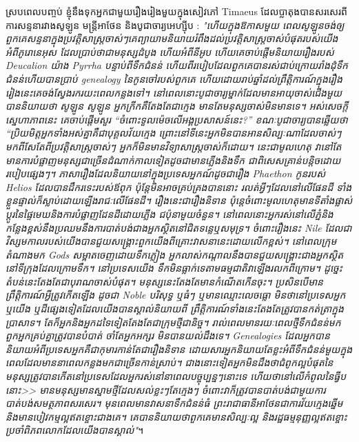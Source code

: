 \documentclass[10pt,twocolumn,letterpaper]{article}
\begin{document}
ស្របពេលបញ្ចប់ ខ្ញុំនឹងទុកអ្នកជាមួយរឿងរៀងមួយ​ក្នុងសៀវភៅ Timaeus ដែលប្លាតុងបានសរសេរពីការសន្ទនារវាង​សូឡូន មន្រ្តីអាថែន និងបូជាចារ្យអេហ្ស៊ីប \cite{140}: \textit{"ហើយក្នុងឱកាសមួយ ពេលសូឡូនចង់ឲ្យពួកគេសន្ទនាក្នុងប្រវត្តិសាស្ត្រចាស់ៗគេព្យាយាមនិយាយរំពឹងដល់ប្រវត្តិសាស្ត្រចាស់បំផុតរបស់យើង អំពីភូរោនេអុស ដែលប្រាប់ថាជាមនុស្សដំបូង ហើយអំពីនីអូប ហើយគេចាប់ផ្តើមនិយាយរឿងរបស់ Deucalion យ៉ាង Pyrrha បន្ទាប់ពីទឹកជំនន់ ហើយពីរបៀបដែលពួកគេបានរស់ជាប់ក្រោយរាំងដុំទឹកជំនន់ហើយបានប្រាប់ genealogy នៃកូនចៅរបស់ពួកគេ ហើយដោយរាប់ឆ្នាំដល់ព្រឹត្តិការណ៍ក្នុងរឿងរៀងនេះគេចង់ស្វែងរករយះពេលកន្លងទៅ។ នៅពេលនោះបូជាចារ្យម្នាក់ដែលមានអាយុចាស់ជើងមួយបាននិយាយថា សូឡូន សូឡូន អ្នកក្រីកគឺតែងតែជាក្មេង មានតែមនុស្សចាស់មិនមានទេ។ អស់សេចក្តីស្នេហាភាពនេះ គេចាប់ផ្តើមសួរ “ចំពោះទួលម៉េចលើអង្គប្រសាសន៍នេះ?” ខណៈបូជាចារ្យបានឆ្លើយថា “ប្រិយមិត្តអ្នកទាំងអស់គ្នាគឺជាបុគ្គលវ័យក្មេង ព្រោះនៅទីនេះអ្នកមិនបានអានសិល្បៈណាដែលចាស់ៗមកពីសែតែពីប្រវត្តិសាស្ត្រចាស់ៗ អ្នកក៏មិនមានវិទ្យាសាស្ត្រចាស់ក៏ដោយ។ នេះជាមូលហេតុ វានៅតែមានការបំផ្លាញមនុស្សជាច្រើនដំណាក់កាលទៀតដូចជាមានភ្លើងនិងទឹក ជាពិសេសគ្រាន់បន្តិចដោយរបៀបផ្សេងៗ។ ភាសារឿងដែលនិយាយនៅក្នុងប្រទេសអ្នកណ៍ដូចជារឿង Phaethon កូនរបស់ Helios ដែលបានដឹករទេះរបស់ឪពុក ប៉ុន្តែមិនអាចគ្រប់គ្រងបាននោះ រលត់អ្វីៗដែលនៅលើផែនដី ទាំងខ្លួនផ្ទាល់ក៏ស្លាប់ដោយឡើងរាជៈលើផែនដី។ រឿងនេះជារឿងនិទាន ប៉ុន្តេចំពោះមូលហេតុមានទីតាំងផ្លាស់ប្តូរនៃផ្ទៃមេឃនិងការបំផ្លាញដែនដីដោយភ្លើង ជប៉ុនាមួយចំនួន។ នៅពេលនោះអ្នករស់នៅលើភ្នំនិងកន្លែងខ្ពស់នឹងប្រឈមនឹងការបាត់បង់ជាងអ្នកស្ថិតនៅជិតទន្លេឬសមុទ្រ។ ចំពោះរឿងនេះ Nile ដែលជាវិស្សមកាលរបស់យើងបានជួយសង្គ្រោះពួកយើងពីគ្រោះវាសនានេះដោយលើកខ្ពស់។ នៅពេលក្រុមតំណាងមក Gods សម្អាតចេញដោយទឹកភ្លៀង អ្នកលាស់កណ្តាលនឹងបានជួយសង្គ្រោះជាងអ្នកស្ថិតនៅទីក្រុងដែលក្រោមទឹក។ នៅប្រទេសយើង ទឹកមិនធ្លាក់ទេតាមធម្មជាតិវាឡើងរលកពីក្រោម។ ដូច្នេះតំបន់នេះតែងតែជាបុរាណចាស់បំផុត។ មនុស្សនេះតែងតែមានកំណើតកើនចុះ។ ប្រសិនបើមានព្រឹត្តិការណ៍អ្វីត្រូវកើតឡើង ដូចជា Noble បរិសុទ្ធ ឬធំៗ ឬមានឈ្មោះលេចធ្លោ មិនថានៅប្រទេសអ្នក ឬយើង ឬដីផ្សេងទៀតដែលយើងបានស្គាល់និយាយពី ព្រឹត្តិការណ៍ទាំងនេះតែងតែត្រូវបានកត់ត្រាក្នុងប្រាសាទ។ តែក៏អ្នកនិងអ្នកដទៃទៀតតែងតែជាក្រុមថ្មីជានិច្ច។ រាល់ពេលមានរយៈពេលថ្មីទឹកជំនន់មកពួកអ្នកគ្រប់គ្នាត្រូវបានបំបាត់ ចាំតែអ្នកអក្សរ មិនបានយល់ដឹងទេ។ Genealogies ដែលអ្នកបាននិយាយអំពីប្រទេសអ្នកគឺជាកុមារកាន់តែជារឿងនិទាន ដោយសារអ្នកនិយាយតែខ្លះអំពីទឹកជំនន់មួយក្នុងពេលដែលមាននាពេលកន្លងមកជាច្រើនកាន់ស្រាប់។ ជាងនោះទៀតអ្នកមិនដឹងថាជំពូកល្អបំផុតនៃមនុស្សត្រូវបានកើតនៅប្រទេសដែលអ្នករស់នៅនាពេលបច្ចុប្បន្នៗនោះទេ ហើយថានៅលើកំពូលនៃធ្វីបនោះ>> មានមនុស្សមានស្នាមថ្មីដែលសល់ខ្លះៗតែក្មេងៗ ចំពោះវាក៏ត្រូវបានបាត់បង់ជាមួយការបាត់បង់សមត្ថភាពសរសេរ។ មុនពេលមានវាសនាទឹកជំនន់ធំ ព្រះរាជាធានីអាថែនជាការវ័យក្មេងឆ្នើមនិងមានបៀវកម្មល្អឥតខ្ចោះជាងគេ។ គេបាននិយាយថាពួកគេមានសិល្បៈល្អ និងរដ្ឋធម្មនុញ្ញល្អឥតខ្ចោះប្រចាំពិភពលោកដែលយើងបានស្គាល់"}។
\end{document}
